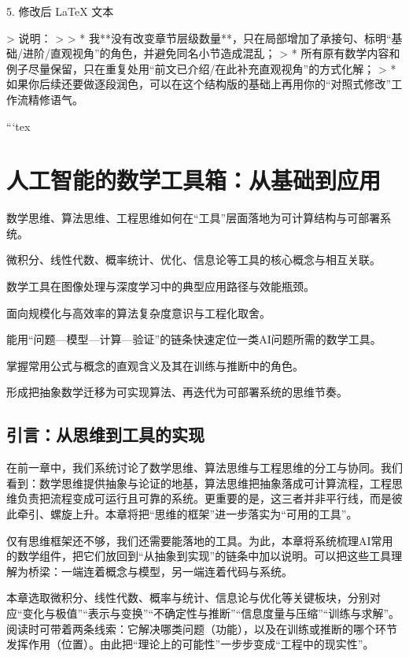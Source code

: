 
5. 修改后 LaTeX 文本

> 说明：
>
> * 我**没有改变章节层级数量**，只在局部增加了承接句、标明“基础/进阶/直观视角”的角色，并避免同名小节造成混乱；
> * 所有原有数学内容和例子尽量保留，只在重复处用“前文已介绍/在此补充直观视角”的方式化解；
> * 如果你后续还要做逐段润色，可以在这个结构版的基础上再用你的“对照式修改”工作流精修语气。

```tex
\chapter{人工智能的数学工具箱：从基础到应用}

\begin{introduction}[本章提要]
  \item 数学思维、算法思维、工程思维如何在“工具”层面落地为可计算结构与可部署系统。
  \item 微积分、线性代数、概率统计、优化、信息论等工具的核心概念与相互关联。
  \item 数学工具在图像处理与深度学习中的典型应用路径与效能瓶颈。
  \item 面向规模化与高效率的算法复杂度意识与工程化取舍。
\end{introduction}
\begin{introduction}[你将收获]
  \item 能用“问题—模型—计算—验证”的链条快速定位一类AI问题所需的数学工具。
  \item 掌握常用公式与概念的直观含义及其在训练与推断中的角色。
  \item 形成把抽象数学迁移为可实现算法、再迭代为可部署系统的思维节奏。
\end{introduction}

\section{引言：从思维到工具的实现}

在前一章中，我们系统讨论了数学思维、算法思维与工程思维的分工与协同。我们看到：数学思维提供抽象与论证的地基，算法思维把抽象落成可计算流程，工程思维负责把流程变成可运行且可靠的系统。更重要的是，这三者并非平行线，而是彼此牵引、螺旋上升。本章将把“思维的框架”进一步落实为“可用的工具”。

仅有思维框架还不够，我们还需要能落地的工具。为此，本章将系统梳理AI常用的数学组件，把它们放回到“从抽象到实现”的链条中加以说明。可以把这些工具理解为桥梁：一端连着概念与模型，另一端连着代码与系统。

本章选取微积分、线性代数、概率与统计、信息论与优化等关键板块，分别对应“变化与极值”“表示与变换”“不确定性与推断”“信息度量与压缩”“训练与求解”。阅读时可带着两条线索：它解决哪类问题（功能），以及在训练或推断的哪个环节发挥作用（位置）。由此把“理论上的可能性”一步步变成“工程中的现实性”。

